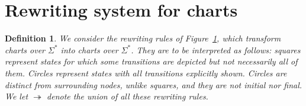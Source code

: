 \documentclass{article}
\newtheorem{definition}{Definition}[section]
\begin{document}
\section{Rewriting system for charts}



    \begin{definition} We consider the rewriting rules of Figure~\ref{},  which transform charts over $\Sigma^*$ into charts
         over
         $\Sigma^*$. They are to be interpreted as follows:
              squares represent states for which some transitions are depicted but not necessarily all of them.
               Circles represent states with all transitions explicitly shown.
                    Circles are distinct from surrounding nodes, unlike squares, and they are not initial nor final.   We let $\twoheadrightarrow$ denote the union of all these rewriting rules.
                    
                    \begin{figure}[h!]
                      \begin{center} 
                        \fboxsep=10pt  %
\fboxrule=1pt   
\end{center}
\end{figure}
\end{definition}
\end{document}
